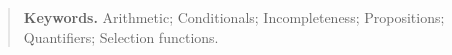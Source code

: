 \documentclass[12pt]{article}
\begin{document}
\begin{abstract}

    \bigskip\noindent\textbf{Keywords.} Arithmetic; Conditionals; Incompleteness; Propositions; Quantifiers; Selection functions.
\end{abstract}
\end{document}

